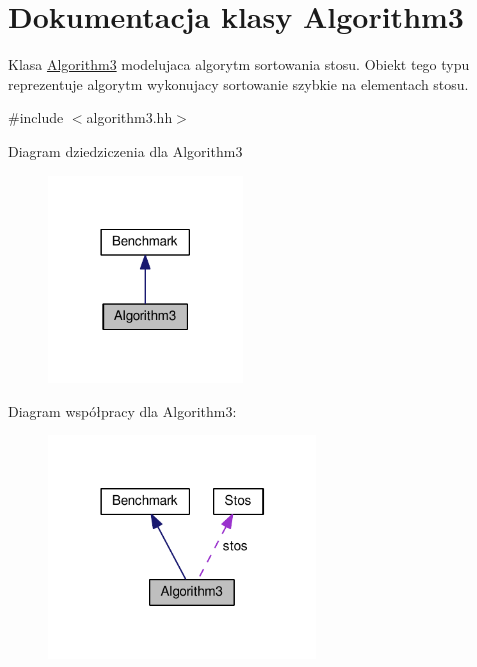 \hypertarget{class_algorithm3}{\section{Dokumentacja klasy Algorithm3}
\label{class_algorithm3}
}


Klasa \hyperlink{class_algorithm3}{Algorithm3} modelujaca algorytm sortowania stosu. Obiekt tego typu reprezentuje algorytm wykonujacy sortowanie szybkie na elementach stosu.  




{\ttfamily \#include $<$algorithm3.\-hh$>$}



Diagram dziedziczenia dla Algorithm3\nopagebreak
\begin{figure}[H]
\begin{center}
\leavevmode
\includegraphics[width=146pt]{class_algorithm3__inherit__graph}
\end{center}
\end{figure}


Diagram współpracy dla Algorithm3\-:\nopagebreak
\begin{figure}[H]
\begin{center}
\leavevmode
\includegraphics[width=201pt]{class_algorithm3__coll__graph}
\end{center}
\end{figure}
